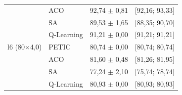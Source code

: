 \begin{table}[htb]
\begin{tabular}{llcc}
         & ACO & 92,74 $\pm$ 0,81 & [92,16; 93,33] \\
         & SA & 89,53 $\pm$ 1,65 & [88,35; 90,70] \\
         & Q-Learning & 91,21 $\pm$ 0,00 & [91,21; 91,21] \\
        \hline
        l6 (80$\times$4,0) & PETIC & 80,74 $\pm$ 0,00 & [80,74; 80,74] \\
         & ACO & 81,60 $\pm$ 0,48 & [81,26; 81,95] \\
         & SA & 77,24 $\pm$ 2,10 & [75,74; 78,74] \\
         & Q-Learning & 80,93 $\pm$ 0,00 & [80,93; 80,93] \\
        \hline
    \end{tabular}
\end{table}
